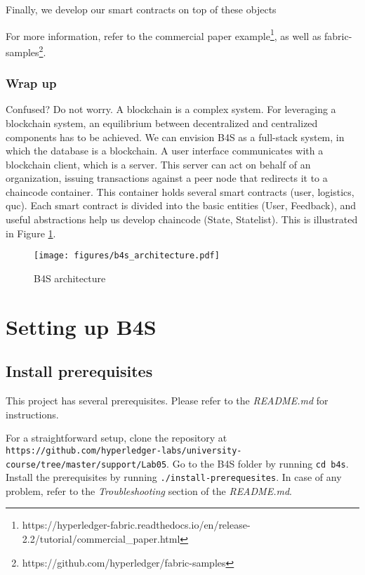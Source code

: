 \documentclass[12pt,a4paper]{article}
\theoremstyle{definition}
\begin{document}
    Finally, we develop our smart contracts on top of these objects


    For more information, refer to the commercial paper example\footnote{https://hyperledger-fabric.readthedocs.io/en/release-2.2/tutorial/commercial\_paper.html}, as well as fabric-samples\footnote{https://github.com/hyperledger/fabric-samples}.



    \subsubsection{Wrap up}
    Confused? Do not worry. A blockchain is a complex system. For leveraging a blockchain system, an equilibrium between decentralized and centralized components has to be achieved. We can envision B4S as a full-stack system, in which the database is a blockchain. A user interface communicates with a blockchain client, which is a server. This server can act on behalf of an organization, issuing transactions against a peer node that redirects it to a chaincode container. This container holds several smart contracts (user, logistics, quc). Each smart contract is divided into the basic entities (User, Feedback), and useful abstractions help us develop chaincode (State, Statelist). This is illustrated in Figure \ref{fig:b4s}.

    \begin{figure}[h]
        \centering
        \texttt{[image: figures/b4s\_architecture.pdf]}
        \caption{B4S architecture}
        \label{fig:b4s}
    \end{figure}


    \section{Setting up B4S}
    \subsection{Install prerequisites}
    This project has several prerequisites. Please refer to the \emph{README.md} for instructions.

    For a straightforward setup, clone the repository at \texttt{https://github.com/hyperledger-labs/university-course/tree/master/support/Lab05}. Go to the B4S folder by running \texttt{cd b4s}. Install the prerequisites by running \texttt{./install-prerequesites}. In case of any problem, refer to the \emph{Troubleshooting} section of the \emph{README.md}.
\end{document}
